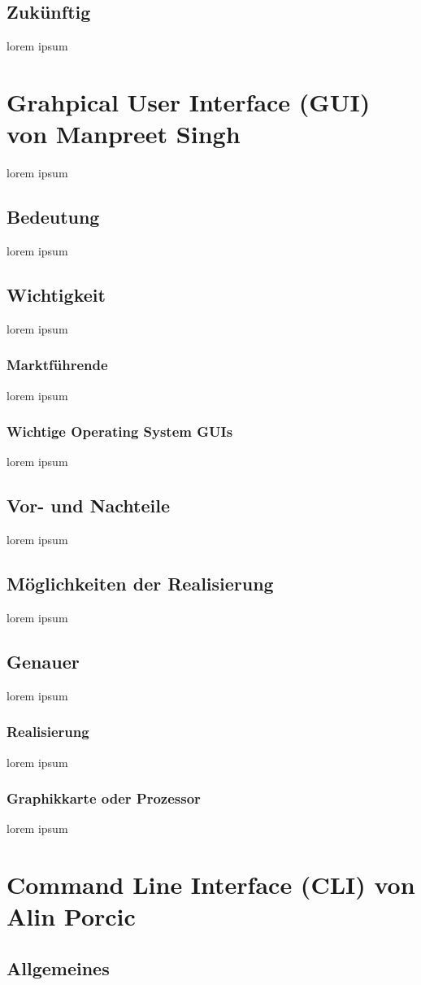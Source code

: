 \documentclass[11pt,a4paper]{report}
\begin{document}
\subsection{Zukünftig}
lorem ipsum 
\section{Grahpical User Interface (GUI) von Manpreet Singh}
lorem ipsum
\subsection{Bedeutung}
lorem ipsum
\subsection{Wichtigkeit}
lorem ipsum
\subsubsection{Marktführende}
lorem ipsum
\subsubsection{Wichtige Operating System GUIs}
lorem ipsum
\subsection{Vor- und Nachteile}
lorem ipsum
\subsection{Möglichkeiten der Realisierung}
lorem ipsum
\subsection{Genauer}
lorem ipsum
\subsubsection{Realisierung}
lorem ipsum
\subsubsection{Graphikkarte oder Prozessor}
lorem ipsum
\section{Command Line Interface (CLI) von Alin Porcic}

\subsection{Allgemeines}
\end{document}
